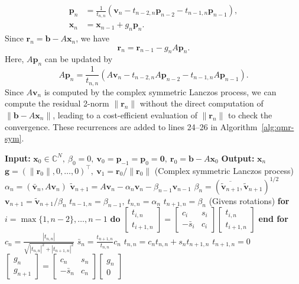 \[\begin{aligned}\bm p_n&=\frac1{t_{n,n}}(\bm v_n-t_{n-2,n}\bm p_{n-2}-t_{n-1,n}\bm p_{n-1}),\\\bm x_n&=\bm x_{n-1}+g_n\bm p_n.\end{aligned}\]
{Since $\bm r_n=\bm b-A\bm x_n$, we have}
\[\bm r_n=\bm r_{n-1}-g_nA\bm p_n.\]
{Here, $A\bm p_n$ can be updated by}
\[A\bm p_n=\frac1{t_{n,n}}(A\bm v_n-t_{n-2,n}A\bm p_{n-2}-t_{n-1,n}A\bm p_{n-1}).\]
{Since $A\bm v_n$ is computed by the complex symmetric Lanczos process, we can compute the residual 2-norm $\|\bm r_n\|$ without the direct computation of $\|\bm b-A\bm x_n\|$, leading to a cost-efficient evaluation of $\|\bm r_n\|$ to check the convergence. These recurrences are added to lines 24--26 in Algorithm\ \ref{alg:qmr-sym}.}
\begin{algorithm}[H]\caption{{The QMR\_SYM method (note: $(\bar{\bm a},\bm b)=\bm a^{\top}\bm b$)}}\label{alg:qmr-sym}\begin{algorithmic}[1]
\Statex\textbf{Input:} $\bm x_0\in\mathbb C^N,\ \beta_0=0,\ \bm v_0=\bm p_{-1}=\bm p_0=\bm0,\ \bm r_0=\bm b-A\bm x_0$
\Statex\textbf{Output:} $\bm x_n$
\State $\bm g=(\|\bm r_0\|,0,\ldots,0)^{\top},\ \bm v_1=\bm r_0/\|\bm r_0\|$
\State ({Complex symmetric Lanczos process})
\State $\alpha_n=(\bar{\bm v}_n,A\bm v_n)$
\State $\widetilde{\bm v}_{n+1}=A\bm v_n-\alpha_n\bm v_n-\beta_{n-1}\bm v_{n-1}$
\State $\beta_n=(\overline{\widetilde{\bm v}_{n+1}},\widetilde{\bm v}_{n+1})^{1/2}$
\State $\bm v_{n+1}=\widetilde{\bm v}_{n+1}/\beta_n$
\State $t_{n-1,n}=\beta_{n-1},\ t_{n,n}=\alpha_n$
\State $t_{n+1,n}=\beta_n$
\State (Givens {rotations})
\State \textbf{for} $i=\max\{1,n-2\},\ldots,n-1$ \textbf{do}
\State $\begin{bmatrix}t_{i,n}\\t_{i+1,n}\end{bmatrix}=\begin{bmatrix}c_i&s_i\\-\bar s_i&c_i\end{bmatrix}\begin{bmatrix}t_{i,n}\\t_{i+1,n}\end{bmatrix}$
\State \textbf{end for}
\State $c_n=\frac{|t_{n,n}|}{\sqrt{|t_{n,n}|^2+|t_{n+1,n}|^2}}$
\State $\bar s_n=\frac{t_{n+1,n}}{t_{n,n}}c_n$
\State $t_{n,n}=c_nt_{n,n}+s_nt_{n+1,n}$
\State $t_{n+1,n}=0$
\State $\begin{bmatrix}g_n\\g_{n+1}\end{bmatrix}=\begin{bmatrix}c_n&s_n\\-\bar s_n&c_n\end{bmatrix}\begin{bmatrix}g_n\\0\end{bmatrix}$

\end{algorithmic}
\end{algorithm}
